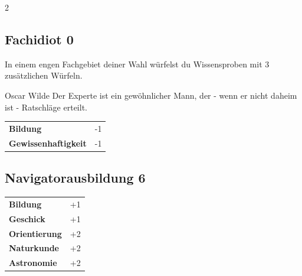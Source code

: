 \begin{multicols}{2}
\begin{tcolorbox}

\end{tcolorbox}

\begin{tcolorbox}
    \subsection*{Fachidiot \hfill \small{0 }}
    \tcblower
In einem engen Fachgebiet deiner Wahl würfelst du Wissensproben mit 3 zusätzlichen Würfeln.

\begin{pquote}{Oscar Wilde}
Der Experte ist ein gewöhnlicher Mann, der - wenn er nicht daheim ist - Ratschläge erteilt.
\end{pquote}

\vspace{3mm}

\begin{tabular}{@{}ll@{}}
    \textbf{Bildung} & -1\\
    \textbf{Gewissenhaftigkeit} & -1\\
\end{tabular}


\end{tcolorbox}

\begin{tcolorbox}
    \subsection*{Navigatorausbildung \hfill \small{6 }}
    \tcblower




\begin{tabular}{@{}ll@{}}
    \textbf{Bildung} & +1\\
    \textbf{Geschick} & +1\\
    \textbf{Orientierung} & +2\\
    \textbf{Naturkunde} & +2\\
    \textbf{Astronomie} & +2\\
\end{tabular}


\end{tcolorbox}
\end{multicols}
